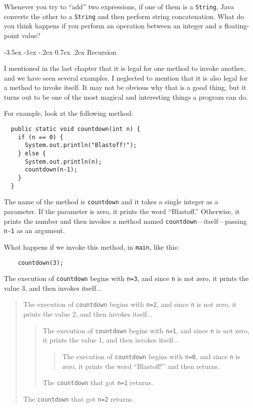\documentclass{book}
\makeatletter
\renewcommand{\section}{\@startsection 
    {section} {1} {0mm}%
    {-3.5ex \@plus -1ex \@minus -.2ex}%
    {0.7ex \@plus.2ex}%
    {\normalfont\Large\bfseries}}
\makeatother
\begin{document}
Whenever you try to ``add'' two
expressions, if one of them is a {\tt String}, Java converts the
other to a {\tt String} and then perform string concatenation.  What do you
think happens if you perform an operation between an integer and a
floating-point value?


\section{Recursion}
\label{recursion}

I mentioned in the last chapter that it is legal for one method to
invoke another, and we have seen several examples.  I neglected to
mention that it is also legal for a method to invoke itself.  It may
not be obvious why that is a good thing, but it turns out to be one of
the most magical and interesting things a program can do.

For example, look at the following method:

\begin{verbatim}
  public static void countdown(int n) {
    if (n == 0) {
      System.out.println("Blastoff!");
    } else {
      System.out.println(n);
      countdown(n-1);
    }
  }
\end{verbatim}
%
The name of the method is {\tt countdown} and it takes a single
integer as a parameter.  If the parameter is zero, it prints
the word ``Blastoff.''  Otherwise, it prints the number and
then invokes a method named {\tt countdown}---itself---passing
{\tt n-1} as an argument.

What happens if we invoke this method, in {\tt main}, like
this:

\begin{verbatim}
    countdown(3);
\end{verbatim}
%
The execution of {\tt countdown} begins with {\tt n=3}, and
since {\tt n} is not zero, it prints the value 3, and then
invokes itself...

\begin{quote}
The execution of {\tt countdown} begins with {\tt n=2}, and
since {\tt n} is not zero, it prints the value 2, and then
invokes itself...

\begin{quote}
The execution of {\tt countdown} begins with {\tt n=1}, and
since {\tt n} is not zero, it prints the value 1, and then
invokes itself...

\begin{quote}
The execution of {\tt countdown} begins with {\tt n=0}, and
since {\tt n} is zero, it prints the word ``Blastoff!''
and then returns.
\end{quote}

The {\tt countdown} that got {\tt n=1} returns.

\end{quote}

The {\tt countdown} that got {\tt n=2} returns.

\end{quote}
\end{document}
